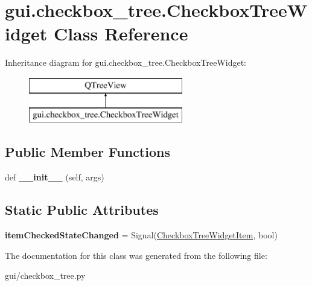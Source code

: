 \hypertarget{classgui_1_1checkbox__tree_1_1_checkbox_tree_widget}{}\section{gui.\+checkbox\+\_\+tree.\+Checkbox\+Tree\+Widget Class Reference}
\label{classgui_1_1checkbox__tree_1_1_checkbox_tree_widget}
Inheritance diagram for gui.\+checkbox\+\_\+tree.\+Checkbox\+Tree\+Widget\+:\begin{figure}[H]
\begin{center}
\leavevmode
\includegraphics[height=2.000000cm]{d8/d6a/classgui_1_1checkbox__tree_1_1_checkbox_tree_widget}
\end{center}
\end{figure}
\subsection*{Public Member Functions}
\begin{DoxyCompactItemize}
\item 
\mbox{\label{classgui_1_1checkbox__tree_1_1_checkbox_tree_widget_a0ace8c573751b042d15e76eaaeb62796}} 
def {\bfseries \+\_\+\+\_\+init\+\_\+\+\_\+} (self, args)
\end{DoxyCompactItemize}
\subsection*{Static Public Attributes}
\begin{DoxyCompactItemize}
\item 
\mbox{\label{classgui_1_1checkbox__tree_1_1_checkbox_tree_widget_a2e3cb15e7fe1d8791cbfbb3dbd42d38a}} 
{\bfseries item\+Checked\+State\+Changed} = Signal(\mbox{\hyperlink{classgui_1_1checkbox__tree_1_1_checkbox_tree_widget_item}{Checkbox\+Tree\+Widget\+Item}}, bool)
\end{DoxyCompactItemize}


The documentation for this class was generated from the following file\+:\begin{DoxyCompactItemize}
\item 
gui/checkbox\+\_\+tree.\+py\end{DoxyCompactItemize}
